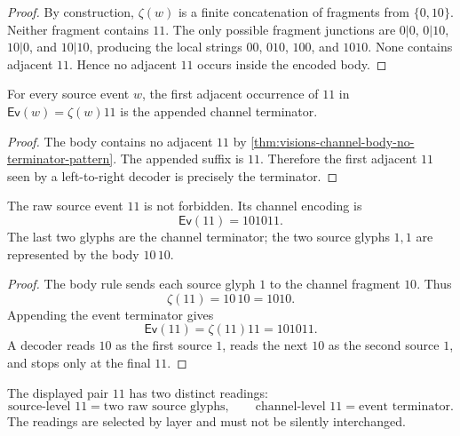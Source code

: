 \begin{proof}
By construction, $\zeta(w)$ is a finite concatenation of fragments from
$\{0,10\}$. Neither fragment contains $11$. The only possible fragment
junctions are $0|0$, $0|10$, $10|0$, and $10|10$, producing the local
strings $00$, $010$, $100$, and $1010$. None contains adjacent $11$.
Hence no adjacent $11$ occurs inside the encoded body.
\end{proof}

\begin{corollary}
\label{cor:visions-first-11-is-event-terminator}
For every source event $w$, the first adjacent occurrence of $11$ in
$\mathsf{Ev}(w)=\zeta(w)11$ is the appended channel terminator.
\end{corollary}

\begin{proof}
The body contains no adjacent $11$ by
\autoref{thm:visions-channel-body-no-terminator-pattern}. The appended
suffix is $11$. Therefore the first adjacent $11$ seen by a
left-to-right decoder is precisely the terminator.
\end{proof}

\begin{theorem}
\label{thm:visions-source-event-11-encodable}
The raw source event $11$ is not forbidden. Its channel encoding is
$$
\mathsf{Ev}(11)=101011.
$$
The last two glyphs are the channel terminator; the two source glyphs
$1,1$ are represented by the body $10\,10$.
\end{theorem}

\begin{proof}
The body rule sends each source glyph $1$ to the channel fragment $10$.
Thus
$$
\zeta(11)=10\,10=1010.
$$
Appending the event terminator gives
$$
\mathsf{Ev}(11)=\zeta(11)11=101011.
$$
A decoder reads $10$ as the first source $1$, reads the next $10$ as the
second source $1$, and stops only at the final $11$.
\end{proof}

\begin{corollary}
\label{cor:visions-layer-separation-11}
The displayed pair $11$ has two distinct readings:
$$
\text{source-level }11=\text{two raw source glyphs},
\qquad
\text{channel-level }11=\text{event terminator}.
$$
The readings are selected by layer and must not be silently interchanged.
\end{corollary}

